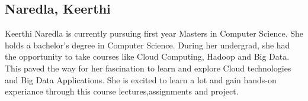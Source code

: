 \subsection{Naredla, Keerthi}

Keerthi Naredla is currently pursuing first year Masters in Computer Science. She holds a bachelor’s degree in Computer Science. 
During her undergrad, she had the opportunity to take courses like Cloud Computing, Hadoop and Big Data. This paved the way  for her 
fascination to learn and explore Cloud technologies and Big Data Applications. She is excited  to learn a lot and gain hands-on experiance 
through this course lectures,assignments and project.
